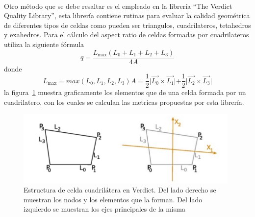 \documentclass[letterpaper, openright, 12pt]{book}
\begin{document}
    \paragraph*{}
        Otro método que se debe resaltar es el empleado en la librería ``The
        Verdict Quality Library'', esta librería contiene rutinas para evaluar
        la calidad geométrica de diferentes tipos de celdas como pueden ser
        triangulos, cuadrilateros, tetahedros y exahedros. Para el cálculo del
        aspect ratio de celdas formadas por cuadrilateros utiliza la siguiente
        fórmula
        \begin{equation}
            q = \frac{L_{\max}\left( L_0 + L_1 + L_2 + L_3 \right)}{4A}
        \end{equation}
        donde
        \begin{subequations}
            \begin{equation*}
                L_{\max} = max\left( L_0, L_1, L_2, L_3 \right)
            \end{equation*}
            \begin{equation*}
                A = \frac{1}{2} \lvert \vec{L_0} \times \vec{L_1} \lvert
                    + \frac{1}{2} \lvert \vec{L_2} \times \vec{L_3} \lvert
            \end{equation*}
        \end{subequations}
        la figura~\ref{aspect_verdict} muestra graficamente los elementos que
        de una celda formada por un cuadrilatero, con los cuales se calculan las
        metricas propuestas por esta librería.

        \begin{figure}[htbp!]
            \centering
            \includegraphics[keepaspectratio, width=110mm]{./Imagenes/aspect_verdict.png}
            \caption[Estrcutura celda cuadrilatera en Verdict]{Estructura de
            celda cuadrilátera en Verdict. Del lado derecho se muestran los
            nodos y los elementos que la forman. Del lado izquierdo se muestran
            los ejes principales de la misma\cite{verdict_quality}}
            \label{aspect_verdict}
        \end{figure}
\end{document}
